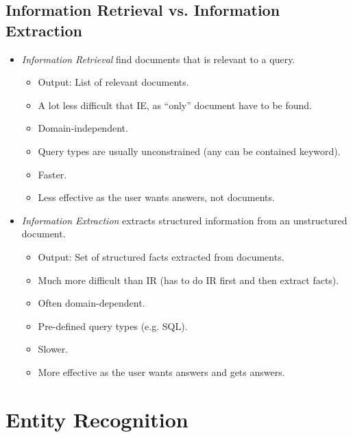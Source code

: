         \subsection{Information Retrieval vs. Information Extraction} %
            \begin{itemize}
            	\item \textit{Information Retrieval} find documents that is relevant to a query.
            		\begin{itemize}
            			\item Output: List of relevant documents.
            			\item A lot less difficult that IE, as \enquote{only} document have to be found.
            			\item Domain-independent.
            			\item Query types are usually unconstrained (any can be contained keyword).
            			\item Faster.
            			\item Less effective as the user wants answers, not documents.
            		\end{itemize}
            	\item \textit{Information Extraction} extracts structured information from an unstructured document.
            		\begin{itemize}
            			\item Output: Set of structured facts extracted from documents.
            			\item Much more difficult than IR (has to do IR first and then extract facts).
            			\item Often domain-dependent.
            			\item Pre-defined query types (e.g. SQL).
            			\item Slower.
            			\item More effective as the user wants answers and gets answers.
            		\end{itemize}
            \end{itemize}

    \section{Entity Recognition} %
